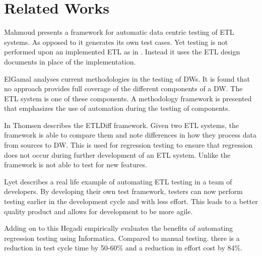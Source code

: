 \section{Related Works}

Mahmoud \cite{dakroryautomated} presents a framework for automatic data centric testing of ETL systems. As opposed to \FW{} it generates its own test cases. Yet testing is not performed upon an implemented ETL as in \FW{}. Instead it uses the ETL design documents in place of the implementation.

ElGamal \cite{elgamal2012towards} analyses current methodologies in the testing of DWs. It is found that no approach provides full coverage of the different components of a DW. The ETL system is one of these components. A methodology framework is presented that emphasizes the use of automation during the testing of components.

In \cite{thomsen2006etldiff} Thomsen describes the ETLDiff framework. Given two ETL systems, the framework is able to compare them and note differences in how they process data from sources to DW. This is used for regression testing to ensure that regression does not occur during further development of an ETL system. Unlike \FW the framework is not able to test for new features.  

Lyet \cite{subuiyer2014} describes a real life example of automating ETL testing in a team of developers. By developing their own test framework, testers can now perform testing earlier in the development cycle and with less effort. This leads to a better quality product and allows for development to be more agile. 

Adding on to this Hegadi \cite{manjunath2012case} empirically evaluates the benefits of automating regression testing using  Informatica. Compared to manual testing. there is a reduction in test cycle time by 50-60\% and a reduction in effort cost by 84\%. 
